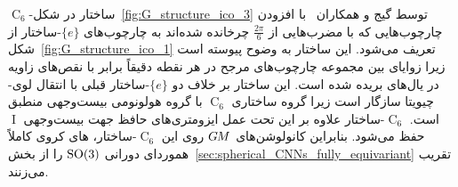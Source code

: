 $\operatorname{C}_6$-ساختار در شکل~\ref{fig:G_structure_ico_3} توسط گیج و همکاران~\cite{gaugeIco2019} با افزودن چارچوب‌هایی که با مضرب‌هایی از $\frac{2\pi}{6}$ چرخانده شده‌اند به چارچوب‌های $\{e\}$-ساختار از شکل~\ref{fig:G_structure_ico_1} تعریف می‌شود.
این ساختار به وضوح پیوسته است زیرا زوایای بین مجموعه چارچوب‌های مرجح در هر نقطه دقیقاً برابر با نقص‌های زاویه در یال‌های بریده شده است.
این ساختار بر خلاف دو $\{e\}$-ساختار قبلی با انتقال لوی-چیویتا سازگار است زیرا گروه ساختاری $\operatorname{C}_6$ با گروه هولونومی بیست‌وجهی منطبق است.
$\operatorname{C}_6$-ساختار علاوه بر این تحت عمل ایزومتری‌های حافظ جهت بیست‌وجهی $\operatorname{I}$ حفظ می‌شود.
بنابراین کانولوشن‌های $G\mkern-1.4muM$ روی این $\operatorname{C}_6$-ساختار، های کروی کاملاً هموردای دورانی $\operatorname{SO}(3)$ را از بخش~\ref{sec:spherical_CNNs_fully_equivariant} تقریب می‌زنند.

